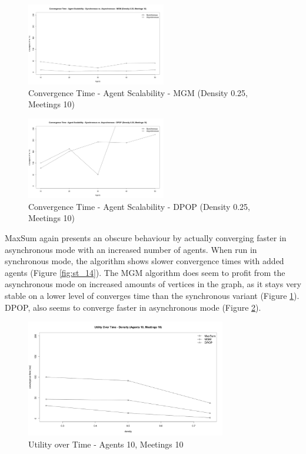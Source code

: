 \begin{figure}[H]
\centering
\includegraphics[width=230px]{graphics/experiments/static/st_15}
\caption{Convergence Time - Agent Scalability - MGM (Density 0.25, Meetings 10)}
\label{fig:st_15}
\end{figure}

\begin{figure}[H]
\centering
\includegraphics[width=230px]{graphics/experiments/static/st_16}
\caption{Convergence Time - Agent Scalability - DPOP (Density 0.25, Meetings 10)}
\label{fig:st_16}
\end{figure}

MaxSum again presents an obscure behaviour by actually converging faster in asynchronous mode with an increased number of agents. When run in synchronous mode, the algorithm shows slower convergence times with added agents (Figure \ref{fig:st_14}). The MGM algorithm does seem to profit from the asynchronous mode on increased amounts of vertices in the graph, as it stays very stable on a lower level of converges time than the synchronous variant (Figure \ref{fig:st_15}). DPOP, also seems to converge faster in asynchronous mode (Figure \ref{fig:st_16}).

\begin{figure}[H]
\centering
\includegraphics[width=330px]{graphics/experiments/static/st_17}
\caption{Utility over Time - Agents 10, Meetings 10}
\label{fig:st_17}
\end{figure}

